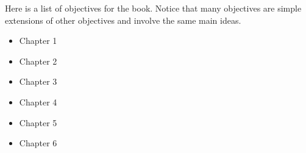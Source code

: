 \documentclass[letterpaper,oneside]{article}%
\begin{document}
Here is a list of objectives for the book.  Notice that many
objectives are simple extensions of other objectives and involve the
same main ideas.  


\begin{itemize}
\item Chapter 1

\item Chapter 2

\item Chapter 3

\item Chapter 4

\item Chapter 5

\item Chapter 6

\end{itemize}

%
\end{document}
